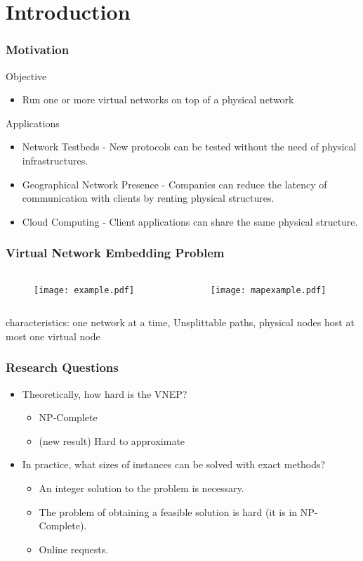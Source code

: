 \documentclass[english]{beamer}
\begin{document}
\section{Introduction}
\begin{frame}
\frametitle{Motivation}
Objective
\begin{itemize}
  \item Run one or more virtual networks on top of a physical network
\end{itemize}
Applications
\begin{itemize}
	\item Network Testbeds - New protocols can be tested without the need of 
      physical infrastructures.
	\item Geographical Network Presence - Companies can reduce the latency of
      communication with clients by renting physical structures.
	\item Cloud Computing - Client applications can share the same physical
      structure.
\end{itemize}
\end{frame}
\begin{frame}
\frametitle{Virtual Network Embedding Problem}
\begin{columns}
\begin{column}{0.5\textwidth}
  \begin{figure}
    \centering
    \texttt{[image: example.pdf]}
  \end{figure}
\end{column}
\begin{column}{0.5\textwidth}
  \begin{figure}
    \centering
    \texttt{[image: mapexample.pdf]}
  \end{figure}
\end{column}
\end{columns}
	characteristics: one network at a time, Unsplittable paths, physical nodes host at most one virtual node
\end{frame}
\begin{frame}
\frametitle{Research Questions}
\begin{itemize}
	\item Theoretically, how hard is the VNEP?
    \begin{itemize}
      \item NP-Complete
      \item (new result) Hard to approximate
    \end{itemize}
	\item In practice, what sizes of instances can be solved with exact methods?
    \begin{itemize}
      \item An integer solution to the problem is necessary.
      \item The problem of obtaining a feasible solution is hard (it is in NP-Complete).
      \item Online requests.
    \end{itemize}
\end{itemize}
\end{frame}
\end{document}
